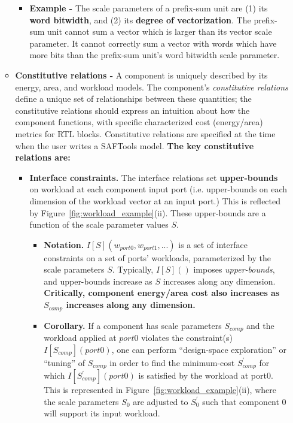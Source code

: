 \begin{itemize}
\begin{itemize}
\begin{itemize}
        \item \textbf{Example -} The scale parameters of a prefix-sum unit are (1) its \textbf{word bitwidth}, and (2) its \textbf{degree of vectorization}. The prefix-sum unit cannot sum a vector which is larger than its vector scale parameter. It cannot correctly sum a vector with words which have more bits than the prefix-sum unit's word bitwidth scale parameter.
    \end{itemize}
    \item \textbf{Constitutive relations -} A component is uniquely described by its energy, area, and workload models. The component's \textit{constitutive relations} define a unique set of relationships between these quantities; the constitutive relations should express an intuition about how the component functions, with specific characterized cost (energy/area) metrics for RTL blocks. Constitutive relations are specified at the time when the user writes a SAFTools model. \textbf{The key constitutive relations are:}
    \begin{itemize}
        \item \textbf{Interface constraints.} The interface relations set \textbf{upper-bounds} on workload at each component input port (i.e. upper-bounds on each dimension of the workload vector at an input port.) This is reflected by Figure~\ref{fig:workload_example}(ii). These upper-bounds are a function of the scale parameter values $S$.
        \begin{itemize}
            \item \textbf{Notation.} $I[S](w_{port0},w_{port1},...)$ is a set of interface constraints on a set of ports' workloads, parameterized by the scale parameters $S$. Typically, $I[S]()$ imposes \textit{upper-bounds}, and upper-bounds increase as $S$ increases along any dimension. \textbf{Critically, component energy/area cost also increases as $S_{comp}$ increases along any dimension.}
            \item \textbf{Corollary.} If a component has scale parameters $S_{comp}$ and the workload applied at $port0$ violates the constraint(s) $I[S_{comp}](port0)$, one can perform ``design-space exploration'' or ``tuning'' of $S_{comp}$ in order to find the minimum-cost $S^\prime_{comp}$ for which $I[S^\prime_{comp}](port0)$ is satisfied by the workload at port0. This is represented in Figure~\ref{fig:workload_example}(ii), where the scale parameters $S_0$ are adjusted to $S^\prime_0$ such that component 0 will support its input workload.
        \end{itemize}

\end{itemize}
\end{itemize}
\end{itemize}
